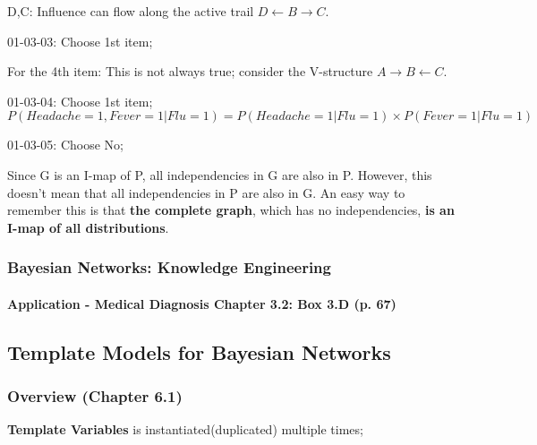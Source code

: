 \documentclass[12pt]{article}
\numberwithin{equation}{section}
\begin{document}
D,C: Influence can flow along the active trail $D \leftarrow B \rightarrow C$.

01-03-03: Choose 1st item;

For the 4th item: This is not always true; consider the V-structure $A \rightarrow B \leftarrow C$.

01-03-04: Choose 1st item;
\[ P(Headache=1,Fever=1|Flu=1)=P(Headache=1|Flu=1) \times P(Fever=1|Flu=1)\]

01-03-05: Choose No;

Since G is an I-map of P, all independencies in G are also in P. However, this doesn't mean that all independencies in P are also in G. An easy way to remember this is that \textbf{the complete graph}, which has no independencies, \textbf{is an I-map of all distributions}.

\subsubsection{Bayesian Networks: Knowledge Engineering}
\paragraph{Application - Medical Diagnosis Chapter 3.2: Box 3.D (p. 67)}

\subsection{Template Models for Bayesian Networks}
\subsubsection{Overview (Chapter 6.1)}
\textbf{Template Variables} is instantiated(duplicated) multiple times;
\end{document}
